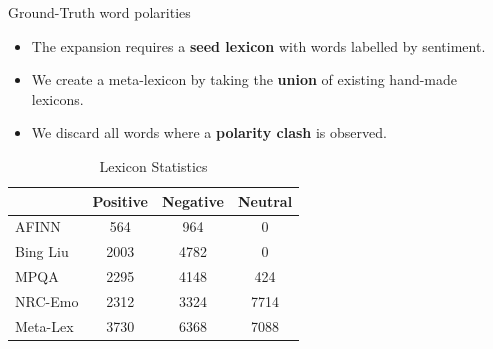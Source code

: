 \documentclass[handout]{beamer}
\begin{document}
\begin{frame}{Ground-Truth word polarities}
\begin{scriptsize}
\begin{itemize}
\item The expansion requires a \textbf{seed lexicon} with words labelled by sentiment.
\item We create a meta-lexicon by taking the \textbf{union} of existing hand-made lexicons.
\item We discard all words where a \textbf{polarity clash} is observed.
\end{itemize}


\begin{table}[htbp]
\begin{center}
\begin{tabular}{l|c|c|c}
\hline
 & Positive & Negative & Neutral \\ \hline
AFINN & 564 & 964 & 0 \\ 
Bing Liu & 2003 & 4782 & 0 \\ 
MPQA & 2295 & 4148 & 424 \\ 
NRC-Emo & 2312 & 3324 & 7714 \\ \hline
Meta-Lex & 3730 & 6368 & 7088 \\ \hline
\end{tabular}
\end{center}
\caption{Lexicon Statistics}
\label{tab:lexstats}
\end{table}
\end{scriptsize}
\end{frame}
\end{document}
